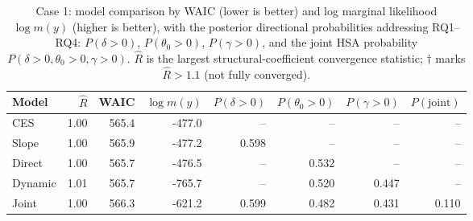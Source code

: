 \begin{table}[H]\centering\small
\caption{Case 1: model comparison by WAIC (lower is better) and log marginal likelihood $\log m(y)$ (higher is better), with the posterior directional probabilities addressing RQ1--RQ4: $P(\delta>0)$, $P(\theta_0>0)$, $P(\gamma>0)$, and the joint HSA probability $P(\delta>0,\theta_0>0,\gamma>0)$. $\hat R$ is the largest structural-coefficient convergence statistic; $\dagger$ marks $\hat R>1.1$ (not fully converged).}
\label{tab:case1_cmp}
\begin{tabular}{lrrrrrrr}\toprule
Model & $\hat R$ & WAIC & $\log m(y)$ & $P(\delta{>}0)$ & $P(\theta_0{>}0)$ & $P(\gamma{>}0)$ & $P(\text{joint})$ \\\midrule
CES & 1.00 & 565.4 & -477.0 & -- & -- & -- & -- \\
Slope & 1.00 & 565.9 & -477.2 & 0.598 & -- & -- & -- \\
Direct & 1.00 & 565.7 & -476.5 & -- & 0.532 & -- & -- \\
Dynamic & 1.01 & 565.7 & -765.7 & -- & 0.520 & 0.447 & -- \\
Joint & 1.00 & 566.3 & -621.2 & 0.599 & 0.482 & 0.431 & 0.110 \\
\bottomrule\end{tabular}\end{table}
